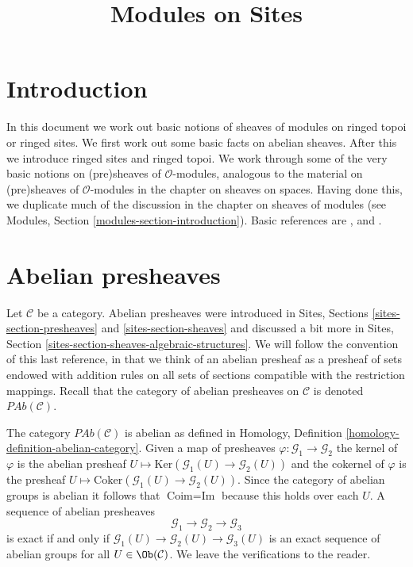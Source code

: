

%


\title{Modules on Sites}


\maketitle

\label{section-phantom}

\tableofcontents

\section{Introduction}
\label{section-introduction}

\noindent
In this document we work out basic notions of sheaves of modules on
ringed topoi or ringed sites. We first work out some basic facts on
abelian sheaves. After this we introduce ringed sites and ringed topoi.
We work through some of the very basic notions on (pre)sheaves of
$\mathcal{O}$-modules, analogous to the material on (pre)sheaves of
$\mathcal{O}$-modules in the chapter on sheaves on spaces.
Having done this, we duplicate much of the discussion in the chapter on
sheaves of modules (see Modules, Section \ref{modules-section-introduction}).
Basic references are \cite{FAC}, \cite{EGA} and \cite{SGA4}.






\section{Abelian presheaves}
\label{section-abelian-pre-sheaves}

\noindent
Let $\mathcal{C}$ be a category.
Abelian presheaves were introduced in
Sites, Sections \ref{sites-section-presheaves}
and \ref{sites-section-sheaves} and discussed a bit more
in Sites, Section \ref{sites-section-sheaves-algebraic-structures}.
We will follow the convention of this last reference, in that we think
of an abelian presheaf as a presheaf of sets endowed with addition rules
on all sets of sections compatible with the restriction mappings.
Recall that the category of abelian presheaves on $\mathcal{C}$
is denoted $\textit{PAb}(\mathcal{C})$.

\medskip\noindent
The category $\textit{PAb}(\mathcal{C})$ is abelian as defined in
Homology, Definition \ref{homology-definition-abelian-category}.
Given a map of presheaves $\varphi : \mathcal{G}_1 \to \mathcal{G}_2$
the kernel of $\varphi$ is the abelian presheaf
$U \mapsto \text{Ker}(\mathcal{G}_1(U) \to \mathcal{G}_2(U))$ and
the cokernel of $\varphi$ is the presheaf
$U \mapsto \text{Coker}(\mathcal{G}_1(U) \to \mathcal{G}_2(U))$.
Since the category of abelian groups is abelian it follows that
$\text{Coim} = \text{Im}$ because this holds over each $U$.
A sequence of abelian presheaves
$$
\mathcal{G}_1 \longrightarrow
\mathcal{G}_2 \longrightarrow
\mathcal{G}_3
$$
is exact if and only if
$\mathcal{G}_1(U) \to \mathcal{G}_2(U) \to \mathcal{G}_3(U)$
is an exact sequence of abelian groups for all $U \in \Ob(\mathcal{C})$.
We leave the verifications to the reader.


